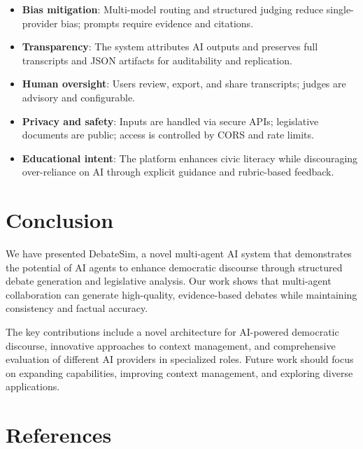 \documentclass{article}
\begin{document}
\begin{itemize}
    \item \textbf{Bias mitigation}: Multi-model routing and structured judging reduce single-provider bias; prompts require evidence and citations.
    \item \textbf{Transparency}: The system attributes AI outputs and preserves full transcripts and JSON artifacts for auditability and replication.
    \item \textbf{Human oversight}: Users review, export, and share transcripts; judges are advisory and configurable.
    \item \textbf{Privacy and safety}: Inputs are handled via secure APIs; legislative documents are public; access is controlled by CORS and rate limits.
    \item \textbf{Educational intent}: The platform enhances civic literacy while discouraging over-reliance on AI through explicit guidance and rubric-based feedback.
\end{itemize}

\section{Conclusion}

We have presented DebateSim, a novel multi-agent AI system that demonstrates the potential of AI agents to enhance democratic discourse through structured debate generation and legislative analysis. Our work shows that multi-agent collaboration can generate high-quality, evidence-based debates while maintaining consistency and factual accuracy.

The key contributions include a novel architecture for AI-powered democratic discourse, innovative approaches to context management, and comprehensive evaluation of different AI providers in specialized roles. Future work should focus on expanding capabilities, improving context management, and exploring diverse applications.

\section*{References}

\medskip
\end{document}
